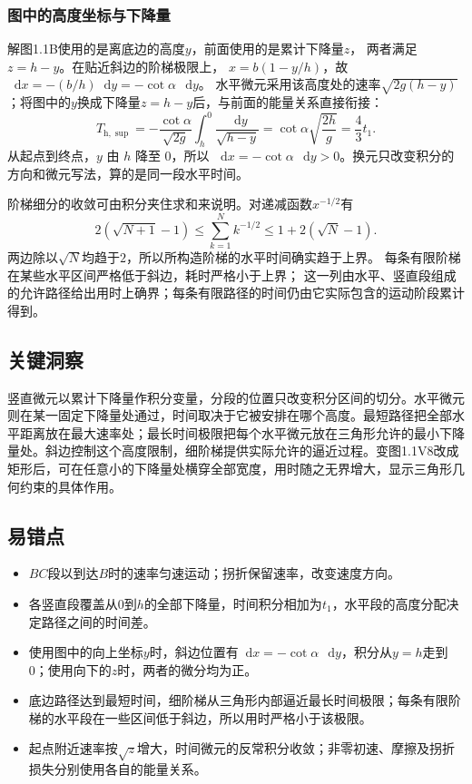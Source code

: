 \documentclass[UTF8,fontset=fandol,a4paper,11pt]{ctexart}
\newcommand{\dd}{\mathop{}\!\mathrm{d}}
\begin{document}
\subsubsection*{图中的高度坐标与下降量}
解图1.1B使用的是离底边的高度$y$，前面使用的是累计下降量$z$，
两者满足$z=h-y$。在贴近斜边的阶梯极限上，
$x=b(1-y/h)$，故$\dd x=-(b/h)\dd y=-\cot\alpha\,\dd y$。
水平微元采用该高度处的速率$\sqrt{2g(h-y)}$；将图中的$y$换成下降量$z=h-y$后，与前面的能量关系直接衔接：
\[
T_{\mathrm h,\sup}
=-\frac{\cot\alpha}{\sqrt{2g}}
\int_h^0\frac{\dd y}{\sqrt{h-y}}
=\cot\alpha\sqrt{\frac{2h}{g}}
=\frac43t_1.
\]
从起点到终点，$y$ 由 $h$ 降至 $0$，所以 $\dd x=-\cot\alpha\,\dd y>0$。换元只改变积分的方向和微元写法，算的是同一段水平时间。

阶梯细分的收敛可由积分夹住求和来说明。对递减函数$x^{-1/2}$有
\[
2(\sqrt{N+1}-1)\leq\sum_{k=1}^Nk^{-1/2}
\leq1+2(\sqrt N-1).
\]
两边除以$\sqrt N$均趋于$2$，所以所构造阶梯的水平时间确实趋于上界。
每条有限阶梯在某些水平区间严格低于斜边，耗时严格小于上界；
这一列由水平、竖直段组成的允许路径给出用时上确界；每条有限路径的时间仍由它实际包含的运动阶段累计得到。




\subsection*{关键洞察}

竖直微元以累计下降量作积分变量，分段的位置只改变积分区间的切分。水平微元则在某一固定下降量处通过，时间取决于它被安排在哪个高度。最短路径把全部水平距离放在最大速率处；最长时间极限把每个水平微元放在三角形允许的最小下降量处。斜边控制这个高度限制，细阶梯提供实际允许的逼近过程。变图1.1V8改成矩形后，可在任意小的下降量处横穿全部宽度，用时随之无界增大，显示三角形几何约束的具体作用。



\subsection*{易错点}

\begin{itemize}
\item $BC$段以到达$B$时的速率匀速运动；拐折保留速率，改变速度方向。
\item 各竖直段覆盖从0到$h$的全部下降量，时间积分相加为$t_1$，水平段的高度分配决定路径之间的时间差。
\item 使用图中的向上坐标$y$时，斜边位置有$\dd x=-\cot\alpha\,\dd y$，积分从$y=h$走到0；使用向下的$z$时，两者的微分均为正。
\item 底边路径达到最短时间，细阶梯从三角形内部逼近最长时间极限；每条有限阶梯的水平段在一些区间低于斜边，所以用时严格小于该极限。
\item 起点附近速率按$\sqrt z$增大，时间微元的反常积分收敛；非零初速、摩擦及拐折损失分别使用各自的能量关系。
\end{itemize}
\end{document}
